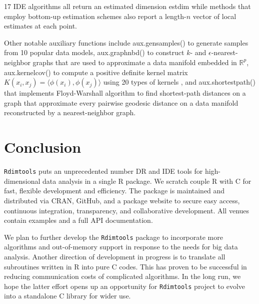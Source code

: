 \documentclass[twoside,11pt]{article}
\newcommand\cpp{C\nolinebreak[4]\hspace{-.05em}\raisebox{.4ex}{\relsize{-3}{\textbf{++}}} }
\newcommand{\Rdimtools}{\texttt{Rdimtools} }
\begin{document}
17 IDE algorithms all return an estimated dimension \textsf{estdim} while methods that employ bottom-up estimation schemes also report a length-$n$ vector of local estimates at each point. 

Other notable auxiliary functions include \textsf{aux.gensamples()} to generate samples from 10 popular data models, \textsf{aux.graphnbd()} to construct $k$- and $\epsilon$-nearest-neighbor graphs that are used to approximate a data manifold embedded in $\mathbb{R}^p$, \textsf{aux.kernelcov()} to compute a positive definite kernel matrix $K(x_i,x_j) = \langle \phi(x_i),\phi(x_j) \rangle$ using 20 types of kernels \citep{hofmann_kernel_2008}, and \textsf{aux.shortestpath()} that implements Floyd-Warshall algorithm \citep{floyd_algorithm_1962a} to find shortest-path distances on a graph that approximate every pairwise geodesic distance on a data manifold reconstructed by a nearest-neighbor graph.

\section{Conclusion}

\Rdimtools puts an unprecedented number DR and IDE tools for high-dimensional data analysis in a single R package. We scratch  couple R with \cpp for fast, flexible development and efficiency. The package is maintained and distributed via CRAN, GitHub, and a package website to secure easy access, continuous integration, transparency, and collaborative development. All venues contain examples and a full API documentation.

We plan to further develop the \Rdimtools package to incorporate more algorithms and out-of-memory support in response to the needs for big data analysis. Another direction of development in progress is to translate all subroutines written in R into pure \cpp codes. This has proven to be successful in reducing communication costs of complicated algorithms. In the long run, we hope the latter effort opens up an opportunity for \Rdimtools project to evolve into a standalone \cpp library for wider use. 









\end{document}

